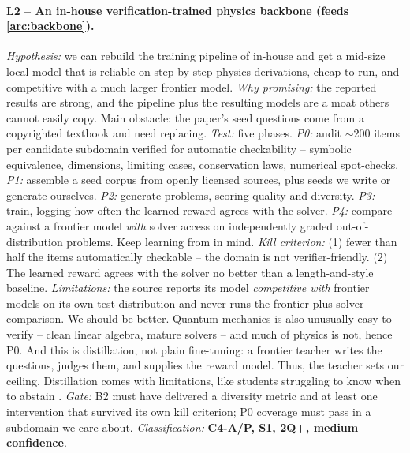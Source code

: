 \paragraph{L2 -- An in-house verification-trained physics backbone (feeds \ref{arc:backbone}).}
\textit{Hypothesis:} we can rebuild the training pipeline of \cite{2604.18176} in-house and get
a mid-size local model that is reliable on step-by-step physics derivations, cheap to run, and
competitive with a much larger frontier model.
%
\textit{Why promising:} the reported results are strong, and the pipeline plus the resulting
models are a moat others cannot easily copy. Main obstacle: the paper's seed questions come from
a copyrighted textbook and need replacing.
%
\textit{Test:} five phases. \emph{P0:} audit $\sim$200 items per candidate
subdomain verified for automatic checkability -- symbolic equivalence, dimensions, limiting cases,
conservation laws, numerical spot-checks. \emph{P1:} assemble a seed corpus from openly licensed
sources, plus seeds we write or generate ourselves. \emph{P2:} generate problems, scoring
quality and diversity. \emph{P3:} train, logging how often the learned reward agrees with the
solver. \emph{P4:} compare against a frontier model \emph{with} solver access on independently
graded out-of-distribution problems. Keep learning from \cite{2604.25110} in mind.
%
\textit{Kill criterion:} (1) fewer than half the items automatically checkable -- the domain is not
verifier-friendly.
(2) The learned reward agrees with the solver no better than a length-and-style baseline.
%
\textit{Limitations:} the source reports its model \emph{competitive with} frontier models on its
own test distribution and never runs the frontier-plus-solver comparison. We should be better.
Quantum mechanics is also unusually easy to verify -- clean linear algebra,
mature solvers -- and much of physics is not, hence P0. And this is distillation, not plain
fine-tuning: a frontier teacher writes the questions, judges them, and supplies the reward model.
Thus, the teacher sets our ceiling. Distillation comes with limitations, like students struggling to know when
to abstain \cite{2604.25110}.
%
\textit{Gate:} B2 must have delivered a diversity metric and at least one intervention that
survived its own kill criterion; P0 coverage must pass in a subdomain we care about.
%
\textit{Classification:} \textbf{C4-A/P, S1, 2Q+, medium confidence}.


